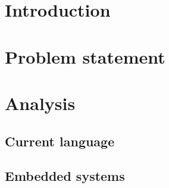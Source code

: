 


\frontmatter %
\newcommand{\ind}[1]{}

\ind{FormaliaForside}
\cleardoublepage %

\ind{FormaliaTitelblad}
\cleardoublepage
\ind{FormaliaProlog.tex}
\ind{FormaliaUnderskriftsside.tex}
\cleardoublepage



\setlength\parskip{0ex} %
\tableofcontents* %
\setlength{\parskip}{3mm} %



\label{marker}
\mainmatter

\pagestyle{custom}

\chapter{Introduction}
\ind{FormaliaIndledning}
\ind{problemstatement}
\renewcommand{\ind}[1]{}
\chapter{Problem statement}
\chapter{Analysis}
	\section{Current language}
	\section{Embedded systems}
	\ind{Hardware}


